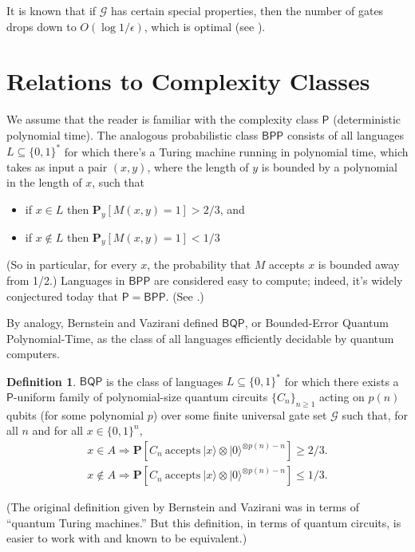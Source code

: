 \documentclass[11pt]{report}
\theoremstyle{plain}
\theoremstyle{definition}
\newtheorem{definition}[theorem]{Definition}
\renewcommand{\Pr}{\mathbf{P}}
\renewcommand{\ket}[1]{|#1\rangle}
\begin{document}
It is known that if $\mathcal{G}$ has certain special properties, then the number of
gates drops down to $O(\log 1/\epsilon)$, which is optimal (see
\cite{HRC02}).



\section{Relations to Complexity Classes}

We assume that the reader is familiar with the complexity class
$\mathsf{P}$ (deterministic polynomial time).  The analogous probabilistic
class $\mathsf{BPP}$ consists of all languages $L\subseteq \{0,1\}^*$ for which there's a
Turing machine running in polynomial time, which takes as input a pair
$(x,y)$, where the length of $y$ is bounded by a polynomial in the length
of $x$, such that
\begin{itemize}
\item if $x \in L$ then $\Pr_y[M(x,y)=1] > 2/3$, and
\item if $x \not\in L$ then $\Pr_y[M(x,y)=1] < 1/3$
\end{itemize}
(So in particular, for every $x$, the probability that $M$ accepts $x$ is bounded away from 1/2.)
Languages in $\mathsf{BPP}$ are considered easy to compute; indeed, it's
widely conjectured today that $\mathsf{P} = \mathsf{BPP}$.  (See \cite{IW97}.)

By analogy, Bernstein and Vazirani \cite{bv} defined $\mathsf{BQP}$, or Bounded-Error Quantum Polynomial-Time, as the class of all languages efficiently decidable by quantum computers.

\begin{definition}
$\mathsf{BQP}$ is the class of languages $L \subseteq \{0,1\}^*$ for which there
exists a $\mathsf{P}$-uniform family of polynomial-size quantum circuits $\{C_n\}_{n \geq 1}$
acting on $p(n)$ qubits (for some polynomial $p$) over some finite universal
gate set $\mathcal{G}$ such that, for all $n$ and for all $x \in \{0,1\}^n,$
\begin{eqnarray*}
x \in A \Longrightarrow \Pr[C_n\ \mbox{accepts}\  \ket{x}\otimes  \ket{0}^{\otimes p(n)-n}] \geq 2/3.\\
x \not\in A \Longrightarrow \Pr[C_n\ \mbox{accepts}\  \ket{x}\otimes  \ket{0}^{\otimes p(n)-n}] \leq 1/3.
\end{eqnarray*}
\end{definition}

(The original definition given by Bernstein and Vazirani was in terms of
``quantum Turing machines.''  But this definition, in terms of quantum circuits, is easier to work with and known to be equivalent.)
\end{document}
